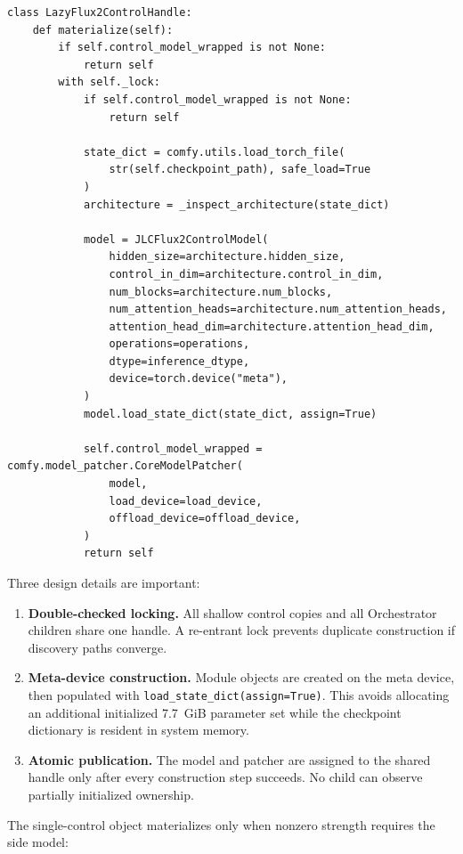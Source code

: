 \documentclass[11pt]{article}
\newcommand{\code}[1]{\texttt{#1}}
\begin{document}
\begin{lstlisting}[style=pythonstyle,caption={Deferred shared model ownership.}]
class LazyFlux2ControlHandle:
    def materialize(self):
        if self.control_model_wrapped is not None:
            return self
        with self._lock:
            if self.control_model_wrapped is not None:
                return self

            state_dict = comfy.utils.load_torch_file(
                str(self.checkpoint_path), safe_load=True
            )
            architecture = _inspect_architecture(state_dict)

            model = JLCFlux2ControlModel(
                hidden_size=architecture.hidden_size,
                control_in_dim=architecture.control_in_dim,
                num_blocks=architecture.num_blocks,
                num_attention_heads=architecture.num_attention_heads,
                attention_head_dim=architecture.attention_head_dim,
                operations=operations,
                dtype=inference_dtype,
                device=torch.device("meta"),
            )
            model.load_state_dict(state_dict, assign=True)

            self.control_model_wrapped = comfy.model_patcher.CoreModelPatcher(
                model,
                load_device=load_device,
                offload_device=offload_device,
            )
            return self
\end{lstlisting}

Three design details are important:

\begin{enumerate}
  \item \textbf{Double-checked locking.} All shallow control copies and all Orchestrator children share one handle. A re-entrant lock prevents duplicate construction if discovery paths converge.
  \item \textbf{Meta-device construction.} Module objects are created on the meta device, then populated with \code{load\_state\_dict(assign=True)}. This avoids allocating an additional initialized 7.7~GiB parameter set while the checkpoint dictionary is resident in system memory.
  \item \textbf{Atomic publication.} The model and patcher are assigned to the shared handle only after every construction step succeeds. No child can observe partially initialized ownership.
\end{enumerate}

The single-control object materializes only when nonzero strength requires the side model:
\end{document}
